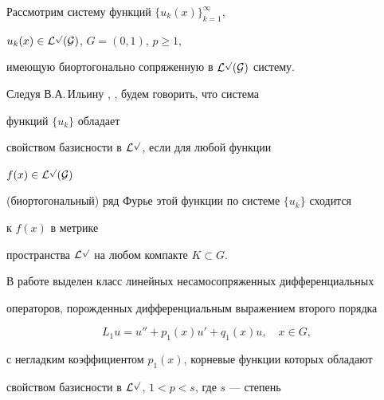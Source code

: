 \date{}







\pagestyle{plain} %













\maketitle


\label{begin}





Рассмотрим систему функций $\{u_k(x)\}^\infty_{k=1}$,


$u_k(x)\in\cal L^p(G)$, $G=(0,1)$, $p\ge 1$,


имеющую биортогонально сопряженную в $\cal L^p(G)$ систему.


Следуя В.А.\,Ильину \cite{1}, \cite{2}, будем говорить, что система


функций $\{u_k\}$ обладает


свойством базисности в $\cal L^p$, если для любой функции


$f(x)\in\cal L^p(G)$


(биортогональный) ряд Фурье этой функции по системе $\{u_k\}$ сходится


к $f(x)$ в метрике


пространства $\cal L^p$ на любом компакте $K\subset G$.





В работе выделен класс линейных несамосопряженных дифференциальных


операторов, порожденных дифференциальным выражением второго порядка


\begin{equation}


L_1u=u''+p_1(x)u'+q_1(x)u,\quad x\in G,


\end{equation}


с негладким коэффициентом $p_1(x)$, корневые функции которых обладают


свойством базисности в $\cal L^p$, $1<p<s$, где $s$ --- степень


